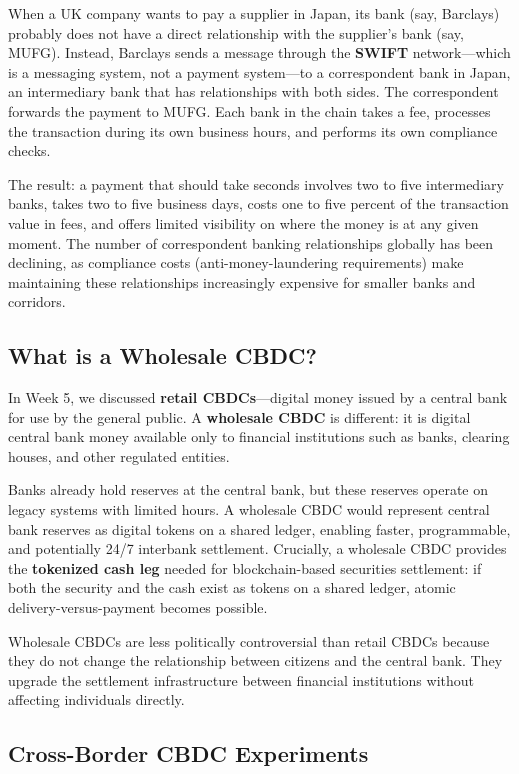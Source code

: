 \documentclass[11pt,a4paper]{article}
\newcommand{\keyword}[1]{\textbf{\textcolor{AccentOrange}{#1}}}
\begin{document}
When a UK company wants to pay a supplier in Japan, its bank (say, Barclays) probably does not have a direct relationship with the supplier's bank (say, MUFG). Instead, Barclays sends a message through the \keyword{SWIFT} network---which is a messaging system, not a payment system---to a correspondent bank in Japan, an intermediary bank that has relationships with both sides. The correspondent forwards the payment to MUFG. Each bank in the chain takes a fee, processes the transaction during its own business hours, and performs its own compliance checks.

The result: a payment that should take seconds involves two to five intermediary banks, takes two to five business days, costs one to five percent of the transaction value in fees, and offers limited visibility on where the money is at any given moment. The number of correspondent banking relationships globally has been declining, as compliance costs (anti-money-laundering requirements) make maintaining these relationships increasingly expensive for smaller banks and corridors.

\subsection{What is a Wholesale CBDC?}

In Week 5, we discussed \keyword{retail CBDCs}---digital money issued by a central bank for use by the general public. A \keyword{wholesale CBDC} is different: it is digital central bank money available only to financial institutions such as banks, clearing houses, and other regulated entities.

Banks already hold reserves at the central bank, but these reserves operate on legacy systems with limited hours. A wholesale CBDC would represent central bank reserves as digital tokens on a shared ledger, enabling faster, programmable, and potentially 24/7 interbank settlement. Crucially, a wholesale CBDC provides the \keyword{tokenized cash leg} needed for blockchain-based securities settlement: if both the security and the cash exist as tokens on a shared ledger, atomic delivery-versus-payment becomes possible.

Wholesale CBDCs are less politically controversial than retail CBDCs because they do not change the relationship between citizens and the central bank. They upgrade the settlement infrastructure between financial institutions without affecting individuals directly.

\subsection{Cross-Border CBDC Experiments}
\end{document}

